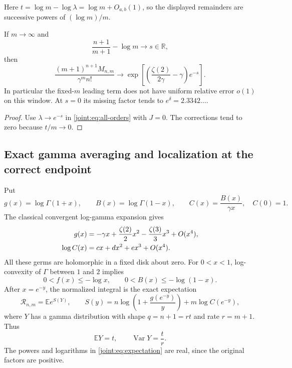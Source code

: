 Here $t=\log m-\log\lambda=\log m+O_{a,b}(1)$, so the displayed
remainders are successive powers of $(\log m)/m$.

\begin{corollary}
\label{joint:cor:limit}
If $m\to\infty$ and
\[
 \frac{n+1}{m+1}-\log m\longrightarrow s\in\mathbb R,
\]
then
\begin{equation}\label{joint:eq:limit}
 \frac{(m+1)^{n+1}M_{n,m}}{\gamma^m n!}
 \longrightarrow
 \exp\left[\left(\frac{\zeta(2)}{2\gamma}-\gamma\right)e^{-s}\right].
\end{equation}
In particular the fixed-$m$ leading term does not have uniform relative
error $o(1)$ on this window. At $s=0$ its missing factor tends to
$e^\delta=2.3342\ldots$.
\end{corollary}
\begin{proof}
Use $\lambda\to e^{-s}$ in \eqref{joint:eq:all-orders} with $J=0$.
The corrections tend to zero because $t/m\to0$.
\end{proof}

\subsection{Exact gamma averaging and localization at the correct endpoint}

Put
\[
 g(x)=\log\Gamma(1+x),\qquad
 B(x)=\log\Gamma(1-x),\qquad
 C(x)=\frac{B(x)}{\gamma x},\quad C(0)=1.
\]
The classical convergent log-gamma expansion
\cite[\S5.7]{joint:DLMF} gives
\begin{align}
 g(x)&=-\gamma x+\frac{\zeta(2)}2x^2
                         -\frac{\zeta(3)}3x^3+O(x^4),\notag\\
 \log C(x)&=cx+dx^2+ex^3+O(x^4).
 \label{joint:eq:local-series}
\end{align}
All these germs are holomorphic in a fixed disk about zero.
For $0<x<1$, log-convexity of $\Gamma$ between $1$ and $2$ implies
\begin{equation}\label{joint:eq:elementary-envelopes}
 0<f(x)\leq-\log x,\qquad
 0<B(x)\leq-\log(1-x).
\end{equation}
After $x=e^{-y}$, the normalized integral is the exact expectation
\begin{equation}\label{joint:eq:expectation}
 \mathcal R_{n,m}=\mathbb E e^{S(Y)},\qquad
 S(y)=n\log\left(1+\frac{g(e^{-y})}{y}\right)
                         +m\log C(e^{-y}),
\end{equation}
where $Y$ has a gamma distribution with shape $q=n+1=rt$ and rate
$r=m+1$. Thus
\[
 \mathbb EY=t,\qquad
 \operatorname{Var}Y=\frac tr.
\]
The powers and logarithms in \eqref{joint:eq:expectation} are real,
since the original factors are positive.

